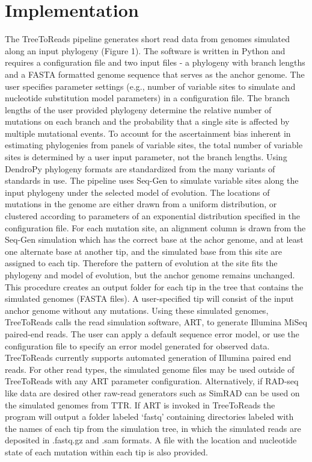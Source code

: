 \documentclass{bmcart}
\begin{document}
\section*{Implementation}
The TreeToReads pipeline generates short read data from genomes simulated along an input phylogeny (Figure 1).
The software is written in Python and requires a configuration file and two input files - a phylogeny with branch lengths and a FASTA formatted genome sequence that serves as the anchor genome.
The user specifies parameter settings (e.g., number of variable sites to simulate and nucleotide substitution model parameters) in a configuration file.
The branch lengths of the user provided phylogeny determine the relative number of mutations on each branch and the probability that a single site is affected by multiple mutational events.
To account for the ascertainment bias inherent in estimating phylogenies from panels of variable sites, the total number of variable sites is determined by a user input parameter, not the branch lengths.
Using DendroPy \cite{sukumaran_dendropy:_2010} phylogeny formats are standardized from the many variants of standards in use.
The pipeline uses Seq-Gen \cite{rambaut_seq-gen:_1997} to simulate variable sites along the input phylogeny under the selected model of evolution.
The locations of mutations in the genome are either drawn from a uniform distribution, or clustered according to parameters of an exponential distribution specified in the configuration file.
For each mutation site, an alignment column is drawn from the Seq-Gen simulation which has the correct base at the achor genome, 
and at least one alternate base at another tip, and the simulated base from this site are assigned to each tip.
Therefore the pattern of evolution at the site fits the phylogeny and model of evolution, but the anchor genome remains unchanged.
This procedure creates an output folder for each tip in the tree that contains the simulated genomes (FASTA files).
A user-specified tip will consist of the input anchor genome without any mutations.
Using these simulated genomes, TreeToReads calls the read simulation software, ART, \cite{huang_art:_2012} to generate Illumina MiSeq paired-end reads.
The user can apply a default sequence error model, or use the configuration file to specify an error model generated for observed data.
TreeToReads currently supports automated generation of Illumina paired end reads.
For other read types, the simulated genome files may be used outside of TreeToReads with any ART parameter configuration.
Alternatively, if RAD-seq like data are desired other raw-read generators such as SimRAD \cite{lepais_simrad:_2014} can be used on the simulated genomes from TTR.
If ART is invoked in TreeToReads the program will output a folder labeled `fastq'
containing directories labeled with the names of each tip from the simulation tree, in which the simulated reads are deposited in .fastq.gz and .sam formats.
A file with the location and nucleotide state of each mutation within each tip is also provided. 
\end{document}

